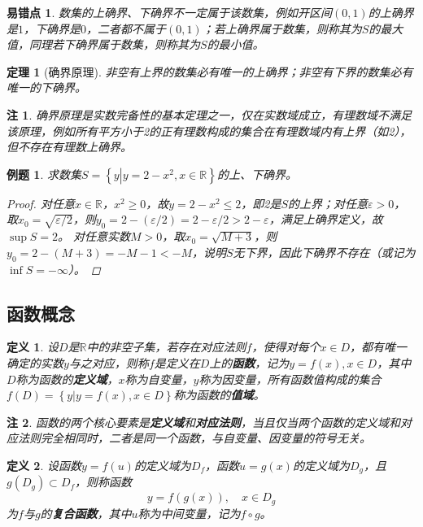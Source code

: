 \documentclass[11pt, a4paper, openany]{article}
\newtheorem{definition}{定义}[section]
\newtheorem{theorem}{定理}[section]
\newtheorem{example}{例题}[section]
\newtheorem{remark}{注}[section]
\newtheorem{errorpoint}{易错点}[section]
\begin{document}
\begin{errorpoint}
数集的上确界、下确界不一定属于该数集，例如开区间$(0,1)$的上确界是$1$，下确界是$0$，二者都不属于$(0,1)$；若上确界属于数集，则称其为$S$的最大值，同理若下确界属于数集，则称其为$S$的最小值。
\end{errorpoint}

\begin{theorem}[确界原理]
非空有上界的数集必有唯一的上确界；非空有下界的数集必有唯一的下确界。
\end{theorem}

\begin{remark}
确界原理是实数完备性的基本定理之一，仅在实数域成立，有理数域不满足该原理，例如所有平方小于2的正有理数构成的集合在有理数域内有上界（如2），但不存在有理数上确界。
\end{remark}

\begin{example}
求数集$S=\left\{y\left|y=2-x^2, x\in\mathbb{R}\right.\right\}$的上、下确界。
\begin{proof}
对任意$x\in\mathbb{R}$，$x^2\geq0$，故$y=2-x^2\leq2$，即2是$S$的上界；对任意$\varepsilon>0$，取$x_0=\sqrt{\varepsilon/2}$，则$y_0=2-(\varepsilon/2)=2-\varepsilon/2>2-\varepsilon$，满足上确界定义，故$\sup S=2$。
对任意实数$M>0$，取$x_0=\sqrt{M+3}$，则$y_0=2-(M+3)=-M-1<-M$，说明$S$无下界，因此下确界不存在（或记为$\inf S=-\infty$）。
\end{proof}
\end{example}

\subsection{函数概念}
\begin{definition}
设$D$是$\mathbb{R}$中的非空子集，若存在对应法则$f$，使得对每个$x\in D$，都有唯一确定的实数$y$与之对应，则称$f$是定义在$D$上的\textbf{函数}，记为$y=f(x), x\in D$，其中$D$称为函数的\textbf{定义域}，$x$称为自变量，$y$称为因变量，所有函数值构成的集合$f(D)=\left\{y\left|y=f(x),x\in D\right.\right\}$称为函数的\textbf{值域}。
\end{definition}

\begin{remark}
函数的两个核心要素是\textbf{定义域}和\textbf{对应法则}，当且仅当两个函数的定义域和对应法则完全相同时，二者是同一个函数，与自变量、因变量的符号无关。
\end{remark}

\begin{definition}
设函数$y=f(u)$的定义域为$D_f$，函数$u=g(x)$的定义域为$D_g$，且$g(D_g)\subset D_f$，则称函数
$$y=f(g(x)),\quad x\in D_g$$
为$f$与$g$的\textbf{复合函数}，其中$u$称为中间变量，记为$f\circ g$。
\end{definition}
\end{document}
